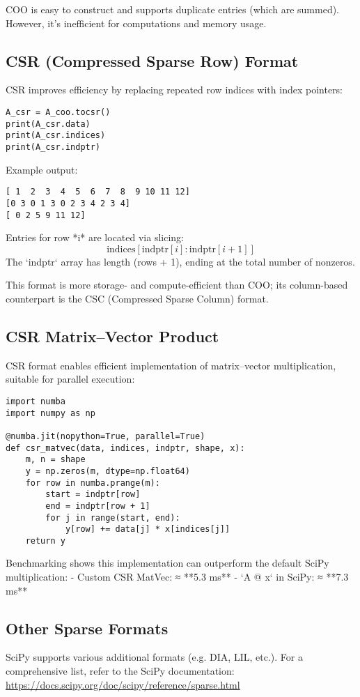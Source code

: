 \documentclass[11pt,a4paper]{book}
\begin{document}
COO is easy to construct and supports duplicate entries (which are summed). However, it’s inefficient for computations and memory usage.

\subsection*{CSR (Compressed Sparse Row) Format}
CSR improves efficiency by replacing repeated row indices with index pointers:

\begin{lstlisting}
A_csr = A_coo.tocsr()
print(A_csr.data)
print(A_csr.indices)
print(A_csr.indptr)
\end{lstlisting}

Example output:
\begin{verbatim}
[ 1  2  3  4  5  6  7  8  9 10 11 12]
[0 3 0 1 3 0 2 3 4 2 3 4]
[ 0 2 5 9 11 12]
\end{verbatim}

Entries for row *i* are located via slicing:
\[
\text{indices}[ \text{indptr}[i] : \text{indptr}[i+1] ]
\]
The `indptr` array has length (rows + 1), ending at the total number of nonzeros.

This format is more storage- and compute-efficient than COO; its column-based counterpart is the CSC (Compressed Sparse Column) format.

\subsection*{CSR Matrix–Vector Product}
CSR format enables efficient implementation of matrix–vector multiplication, suitable for parallel execution:

\begin{lstlisting}
import numba
import numpy as np

@numba.jit(nopython=True, parallel=True)
def csr_matvec(data, indices, indptr, shape, x):
    m, n = shape
    y = np.zeros(m, dtype=np.float64)
    for row in numba.prange(m):
        start = indptr[row]
        end = indptr[row + 1]
        for j in range(start, end):
            y[row] += data[j] * x[indices[j]]
    return y
\end{lstlisting}

Benchmarking shows this implementation can outperform the default SciPy multiplication:
- Custom CSR MatVec: ≈ **5.3 ms**
- `A @ x` in SciPy: ≈ **7.3 ms**

\subsection*{Other Sparse Formats}
SciPy supports various additional formats (e.g. DIA, LIL, etc.). For a comprehensive list, refer to the SciPy documentation:
\url{https://docs.scipy.org/doc/scipy/reference/sparse.html}
\end{document}
